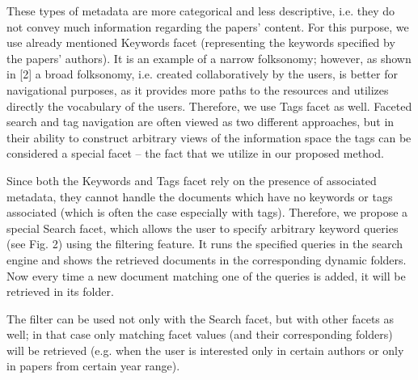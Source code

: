\documentclass[12pt]{article}
\begin{document}
These types of metadata are more categorical and less descriptive, i.e. they do not convey much information regarding the papers’ content. For this purpose, we use already mentioned Keywords facet (representing the keywords specified by the papers’ authors). It is an example of a narrow folksonomy; however, as shown in [2] a broad folksonomy, i.e. created collaboratively by the users, is better for navigational purposes, as it provides more paths to the resources and utilizes directly the vocabulary of the users. Therefore, we use Tags facet as well. Faceted search and tag navigation are often viewed as two different approaches, but in their ability to construct arbitrary views of the information space the tags can be considered a special facet – the fact that we utilize in our proposed method.
 
Since both the Keywords and Tags facet rely on the presence of associated metadata, they cannot handle the documents which have no keywords or tags associated (which is often the case especially with tags). Therefore, we propose a special Search facet, which allows the user to specify arbitrary keyword queries (see Fig. 2) using the filtering feature. It runs the specified queries in the search engine and shows the retrieved documents in the corresponding dynamic folders. Now every time a new document matching one of the queries is added, it will be retrieved in its folder.
  
The filter can be used not only with the Search facet, but with other facets as well; in that case only matching facet values (and their corresponding folders) will be retrieved (e.g. when the user is interested only in certain authors or only in papers from certain year range). 
\end{document}
